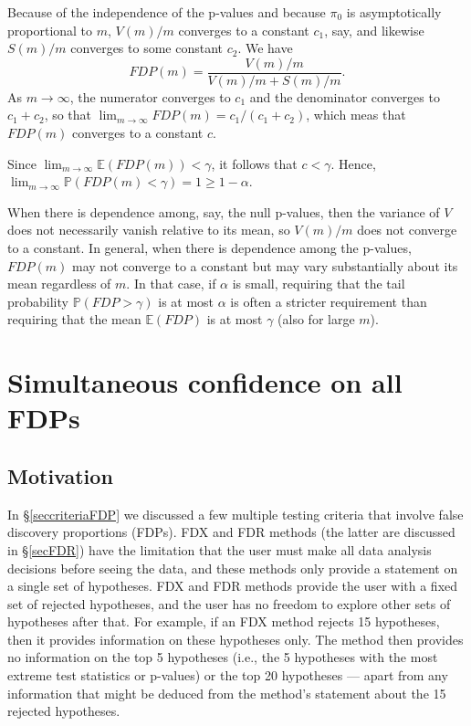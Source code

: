 \documentclass[11pt]{article}
\theoremstyle{plain}
\theoremstyle{definition}
\newcommand{\pr}{\mathbb{P}}
\begin{document}
\begin{sols}
\begin{enumerate}
Because of the independence of the p-values and because $\pi_0$ is asymptotically proportional to $m$, $V(m)/m$ converges to a constant $c_1$, say, and likewise $S(m)/m$ converges to some constant $c_2$. We have 
$$FDP(m) = \frac{V(m)/m}{V(m)/m+S(m)/m}.$$
As $m\rightarrow\infty$, the numerator converges to $c_1$ and the denominator converges to $c_1+c_2$, so that  $\lim_{m\rightarrow\infty}FDP(m) = c_1/(c_1+c_2)$, which meas that $FDP(m)$ converges to a constant $c$.
 
Since $\lim_{m\rightarrow\infty} \mathbb{E}(FDP(m))< \gamma$, it follows that $c<\gamma$.
Hence,  $\lim_{m\rightarrow\infty} \pr(FDP(m)< \gamma)=1 \geq 1-\alpha$.
 
When there is dependence among, say, the null p-values, then  the variance of $V$ does not necessarily vanish relative to its mean, so $V(m)/m$ does not converge to a constant. In general, when there is dependence among the p-values,  $FDP(m)$ may not converge to a constant but may vary substantially about its mean regardless of $m$. In that case, if $\alpha$ is small, requiring that  the tail probability $\pr(FDP>\gamma)$ is at most $\alpha$ is often a stricter requirement than requiring that the mean $\mathbb{E}(FDP)$ is at most $\gamma$ (also for large $m$).
 


\end{enumerate}
\end{sols}


 \newpage
 
 \section{Simultaneous confidence on all FDPs} \label{secCTPfdp}

\subsection{Motivation}
In \S\ref{seccriteriaFDP} we discussed a few  multiple testing criteria that  involve false discovery proportions (FDPs). FDX and FDR methods (the latter are discussed in \S\ref{secFDR}) have the limitation that the user must make all data analysis decisions before seeing the data, and these methods only provide a statement on a single set of hypotheses. FDX and FDR methods provide the user with a fixed set of rejected hypotheses, and the user has no freedom to explore other sets of hypotheses after that. For example, if an FDX method rejects 15 hypotheses, then it provides information on these hypotheses only. The method then provides no information on the top 5 hypotheses (i.e., the 5 hypotheses with the most extreme test statistics or p-values) or the top 20 hypotheses --- apart from any information that might be deduced from the method's statement about the 15 rejected hypotheses.
\end{document}
